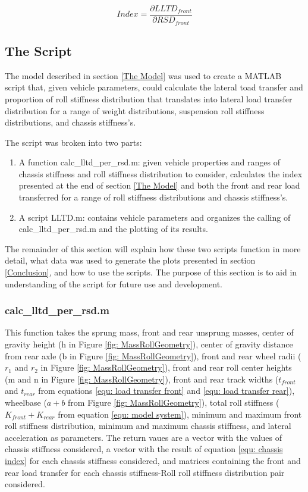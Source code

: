 \documentclass[a4paper]{article}
\numberwithin{equation}{section}
\begin{document}
\begin{equation}
Index=\frac{\partial LLTD_{front}}{\partial RSD_{front}}
\label{equ: chassis index}
\end{equation}

\subsection{The Script} \label{The Script}
The model described in section \ref{The Model} was used to create a MATLAB script that, given vehicle parameters, could calculate the lateral toad transfer and proportion of roll stiffness distribution that translates into lateral load transfer distribution for a range of weight distributions, suspension roll stiffness distributions, and chassis stiffness’s.

The script was broken into two parts:
\begin{enumerate}
	\item A function calc\_lltd\_per\_rsd.m: given vehicle properties and ranges of chassis stiffness and roll stiffness distribution to consider, calculates the index presented at the end of section \ref{The Model} and both the front and rear load transferred for a range of roll stiffness distributions and chassis stiffness’s.
	\item A script LLTD.m: contains vehicle parameters and organizes the calling of calc\_lltd\_per\_rsd.m and the plotting of its results.
\end{enumerate}

The remainder of this section will explain how these two scripts function in more detail, what data was used to generate the plots presented in section \ref{Conclusion}, and how to use the scripts. The purpose of this section is to aid in understanding of the script for future use and development.

\subsubsection{calc\_lltd\_per\_rsd.m} \label{calc_lltd_per_rsd.m}
This function takes the sprung mass, front and rear unsprung masses, center of gravity height (h in Figure \ref{fig: MassRollGeometry}), center of gravity distance from rear axle (b in Figure \ref{fig: MassRollGeometry}), front and rear wheel radii ($r_1$ and $r_2$ in Figure \ref{fig: MassRollGeometry}), front and rear roll center heights (m and n in Figure \ref{fig: MassRollGeometry}), front and rear track widths ($t_{front}$ and $t_{rear}$ from equations \ref{equ: load transfer front} and \ref{equ: load transfer rear}), wheelbase ($a+b$ from Figure \ref{fig: MassRollGeometry}), total roll stiffness ($K_{front} + K_{rear}$ from equation \ref{equ: model system}), minimum and maximum front roll stiffness distribution, minimum and maximum chassis stiffness, and lateral acceleration as parameters. The return vaues are a vector with the values of chassis stiffness considered, a vector with the result of equation \ref{equ: chassis index} for each chassis stiffness considered, and matrices containing the front and rear load transfer for each chassis stiffness-Roll roll stiffness distribution pair considered.
\end{document}
